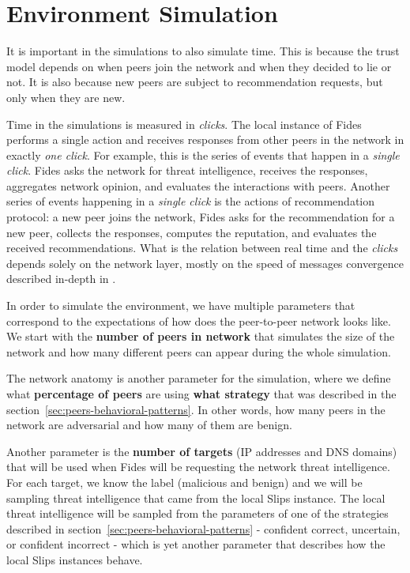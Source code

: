 \section{Environment Simulation}
\label{sec:environment-simulation}
It is important in the simulations to also simulate time. This is because the trust model depends on when peers join the network and when they decided to lie or not. It is also because new peers are subject to recommendation requests, but only when they are new.

Time in the simulations is measured in \textit{clicks}. 
The local instance of Fides performs a single action and receives responses from other peers in the network in exactly \textit{one click}. 
For example, this is the series of events that happen in a \textit{single click}. Fides asks the network for threat intelligence, receives the responses, aggregates network opinion, and evaluates the interactions with peers.
Another series of events happening in a \textit{single click} is the actions of  recommendation protocol: a new peer joins the network, Fides asks for the recommendation for  a new peer, collects the responses, computes the reputation, and evaluates the received recommendations.
What is the relation between real time and the \textit{clicks} depends solely on the network layer, mostly on the speed of messages convergence described in-depth in \cite{nl}.

In order to simulate the environment, we have multiple parameters that correspond to the expectations of how does the peer-to-peer network looks like.
We start with the \textbf{number of peers in network} that simulates the size of the network and how many different peers can appear during the whole simulation.

The network anatomy is another parameter for the simulation, where we define what \textbf{percentage of peers} are using \textbf{what strategy} that was described in the section~\ref{sec:peers-behavioral-patterns}. 
In other words, how many peers in the network are adversarial and how many of them are benign.

Another parameter is the \textbf{number of targets} (IP addresses and DNS domains) that will be used when Fides will be requesting the network threat intelligence.
For each target, we know the label (malicious and benign) and we will be sampling threat intelligence that came from the local Slips instance. 
The local threat intelligence will be sampled from the parameters of one of the strategies described in section~\ref{sec:peers-behavioral-patterns} - confident correct, uncertain, or confident incorrect - which is yet another parameter that describes how the local Slips instances behave.

